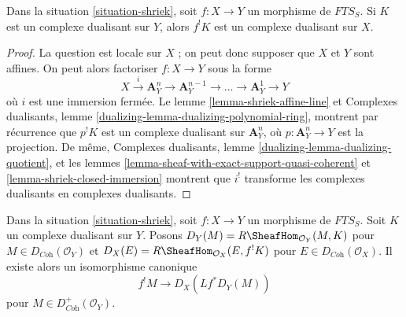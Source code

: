 \begin{lemma}
\label{lemma-shriek-dualizing}
Dans la situation \ref{situation-shriek}, soit $f : X \to Y$ un morphisme de $\textit{FTS}_S$. Si $K$ est un complexe dualisant sur $Y$, alors $f^!K$ est un complexe dualisant sur $X$.
\end{lemma}

\begin{proof}
La question est locale sur $X$ ; on peut donc supposer que $X$ et $Y$ sont affines. On peut alors factoriser $f : X \to Y$ sous la forme
$$
X \xrightarrow{i} \mathbf{A}^n_Y \to \mathbf{A}^{n - 1}_Y \to \ldots \to
\mathbf{A}^1_Y \to Y
$$
où $i$ est une immersion fermée. Le lemme \ref{lemma-shriek-affine-line} et Complexes dualisants, lemme \ref{dualizing-lemma-dualizing-polynomial-ring}, montrent par récurrence que $p^!K$ est un complexe dualisant sur $\mathbf{A}^n_Y$, où $p : \mathbf{A}^n_Y \to Y$ est la projection. De même, Complexes dualisants, lemme \ref{dualizing-lemma-dualizing-quotient}, et les lemmes \ref{lemma-sheaf-with-exact-support-quasi-coherent} et \ref{lemma-shriek-closed-immersion} montrent que $i^!$ transforme les complexes dualisants en complexes dualisants.
\end{proof}

\begin{lemma}
\label{lemma-shriek-via-duality}
Dans la situation \ref{situation-shriek}, soit $f : X \to Y$ un morphisme de $\textit{FTS}_S$. Soit $K$ un complexe dualisant sur $Y$. Posons $D_Y(M) = R\SheafHom_{\mathcal{O}_Y}(M, K)$ pour $M \in D_{\textit{Coh}}(\mathcal{O}_Y)$ et $D_X(E) = R\SheafHom_{\mathcal{O}_X}(E, f^!K)$ pour $E \in D_{\textit{Coh}}(\mathcal{O}_X)$. Il existe alors un isomorphisme canonique
$$
f^!M \longrightarrow D_X(Lf^*D_Y(M))
$$
pour $M \in D_{\textit{Coh}}^+(\mathcal{O}_Y)$.
\end{lemma}

